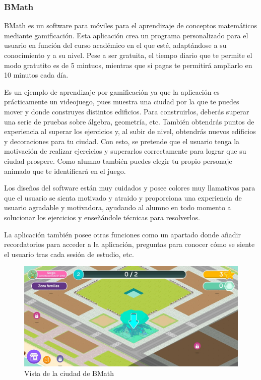     
    \subsubsection{BMath}
    BMath es un software para móviles para el aprendizaje de conceptos matemáticos mediante gamificación. Esta aplicación crea un programa personalizado para el
    usuario en función del curso académico en el que esté, adaptándose a su conocimiento y a su nivel. Pese a ser gratuita, el tiempo diario que te permite el
    modo gratutito es de 5 mintuos, mientras que si pagas te permitirá ampliarlo en 10 minutos cada día. 

    Es un ejemplo de aprendizaje por gamificación ya que la aplicación es prácticamente un videojuego, pues muestra una ciudad por la que te puedes mover y donde construyes distintos edificios. Para construirlos, deberás superar
    una serie de pruebas sobre álgebra, geometría, etc. También obtendrás puntos de experiencia al superar los ejercicios y, al subir de nivel, obtendrás nuevos edificios y decoraciones para tu ciudad. Con esto, se pretende que el usuario
    tenga la motivación de realizar ejercicios y superarlos correctamente para lograr que su ciudad prospere. Como alumno también puedes elegir tu propio personaje animado que te identificará en el juego.

    Los diseños del software están muy cuidados y posee colores muy llamativos para que el usuario se sienta motivado y atraido y proporciona una experiencia de usuario agradable y motivadora, ayudando al alumno en todo momento 
    a solucionar los ejercicios y enseñándole técnicas para resolverlos.

    La aplicación también posee otras funciones como un apartado donde añadir recordatorios para acceder a la aplicación, preguntas para conocer cómo se siente el usuario tras cada sesión de estudio, etc.

    \begin{figure}[H]
        \centering
        \includegraphics[width=\textwidth]{imagenes/c2/bmath.jpeg}
        \caption{Vista de la ciudad de BMath}
    \end{figure}


